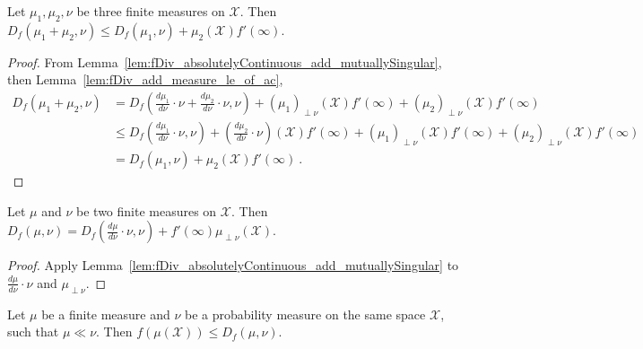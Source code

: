 \begin{lemma}
  \label{lem:fDiv_add_measure_le}
  \leanok
  Let $\mu_1, \mu_2, \nu$ be three finite measures on $\mathcal X$. Then
  $D_f(\mu_1 + \mu_2, \nu) \le D_f(\mu_1, \nu) + \mu_2(\mathcal X) f'(\infty)$.
\end{lemma}

\begin{proof}\leanok
{}
From Lemma~\ref{lem:fDiv_absolutelyContinuous_add_mutuallySingular}, then Lemma~\ref{lem:fDiv_add_measure_le_of_ac},
\begin{align*}
D_f(\mu_1 + \mu_2, \nu)
&= D_f(\frac{d\mu_1}{d \nu}\cdot \nu + \frac{d\mu_2}{d \nu}\cdot \nu, \nu) + (\mu_1)_{\perp\nu}(\mathcal X) f'(\infty) + (\mu_2)_{\perp\nu}(\mathcal X) f'(\infty)
\\
&\le D_f(\frac{d\mu_1}{d \nu}\cdot \nu, \nu) + (\frac{d\mu_2}{d \nu}\cdot \nu)(\mathcal X) f'(\infty) + (\mu_1)_{\perp\nu}(\mathcal X) f'(\infty) + (\mu_2)_{\perp\nu}(\mathcal X) f'(\infty)
\\
&= D_f(\mu_1, \nu) + \mu_2(\mathcal X) f'(\infty)
\: .
\end{align*}
\end{proof}

\begin{lemma}
  \label{lem:fDiv_eq_add_withDensity_derivAtTop}
  \leanok
  Let $\mu$ and $\nu$ be two finite measures on $\mathcal X$.
  Then $D_f(\mu, \nu) = D_f(\frac{d\mu}{d\nu}\cdot \nu, \nu) + f'(\infty) \mu_{\perp \nu}(\mathcal X)$.
\end{lemma}

\begin{proof}\leanok
{}
Apply Lemma~\ref{lem:fDiv_absolutelyContinuous_add_mutuallySingular} to $\frac{d\mu}{d\nu}\cdot \nu$ and $\mu_{\perp \nu}$.
\end{proof}

\begin{lemma}
  \label{lem:le_fDiv_of_ac}
  \leanok
  Let $\mu$ be a finite measure and $\nu$ be a probability measure on the same space $\mathcal X$, such that $\mu \ll \nu$. Then $f(\mu(\mathcal X)) \le D_f(\mu, \nu)$.
\end{lemma}

